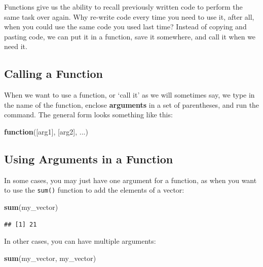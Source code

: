 \documentclass[
]{book}
\newenvironment{Shaded}{\begin{snugshade}}{\end{snugshade}}
\newcommand{\ControlFlowTok}[1]{\textcolor[rgb]{0.13,0.29,0.53}{\textbf{#1}}}
\newcommand{\FunctionTok}[1]{\textcolor[rgb]{0.13,0.29,0.53}{\textbf{#1}}}
\newcommand{\NormalTok}[1]{#1}
\begin{document}
Functions give us the ability to recall previously written code to perform the same task over again. Why re-write code every time you need to use it, after all, when you could use the same code you used last time? Instead of copying and pasting code, we can put it in a function, save it somewhere, and call it when we need it.

\hypertarget{calling-a-function}{%
\subsection{Calling a Function}\label{calling-a-function}}

When we want to use a function, or `call it' as we will sometimes say, we type in the name of the function, enclose \textbf{arguments} in a set of parentheses, and run the command. The general form looks something like this:

\begin{Shaded}
\begin{Highlighting}[]
\ControlFlowTok{function}\NormalTok{([arg1], [arg2], ...)}
\end{Highlighting}
\end{Shaded}

\hypertarget{using-arguments-in-a-function}{%
\subsection{Using Arguments in a Function}\label{using-arguments-in-a-function}}

In some cases, you may just have one argument for a function, as when you want to use the \texttt{sum()} function to add the elements of a vector:

\begin{Shaded}
\begin{Highlighting}[]
\FunctionTok{sum}\NormalTok{(my\_vector)}
\end{Highlighting}
\end{Shaded}

\begin{verbatim}
## [1] 21
\end{verbatim}

In other cases, you can have multiple arguments:

\begin{Shaded}
\begin{Highlighting}[]
\FunctionTok{sum}\NormalTok{(my\_vector, my\_vector)}
\end{Highlighting}
\end{Shaded}
\end{document}
